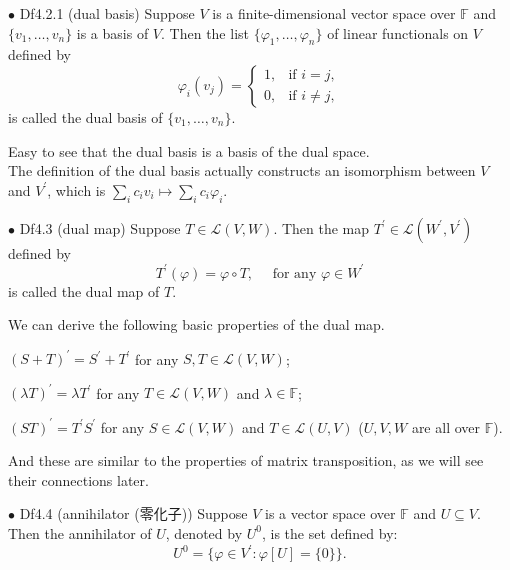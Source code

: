 \documentclass{article}
\begin{document}
\begin{Df}{$\bullet$ Df4.2.1 (dual basis)}
    Suppose $V$ is a finite-dimensional vector space over $\mathbb{F}$ and $\{v_1, \dots, v_n\}$ is a basis of $V$. Then the list $\{\varphi_1, \dots, \varphi_n\}$ of linear functionals on $V$ defined by
    \begin{equation*}
        \varphi_i(v_j) = \begin{cases}
            1, & \text{if } i = j,\\
            0, & \text{if } i \neq j,
        \end{cases}
    \end{equation*}
    is called the dual basis of $\{v_1, \dots, v_n\}$.
\end{Df}

\begin{Rmk}{}
    Easy to see that \textcolor{Th}{the dual basis is a basis of the dual space.}\\
    \textcolor{Th}{The definition of the dual basis actually constructs an isomorphism between $V$ and $V^\prime$, which is $\sum_{i} c_iv_i\mapsto \sum_{i} c_i\varphi_i$.}
\end{Rmk}

\begin{Df}{$\bullet$ Df4.3 (dual map)}
    Suppose $T\in\mathcal{L}(V, W)$. Then the map $T^\prime\in\mathcal{L}(W^\prime, V^\prime)$ defined by
    $$ T^\prime(\varphi) = \varphi\circ T, \quad\text{ for any }\varphi\in W^\prime$$
    is called the dual map of $T$.
\end{Df}

\begin{Rmk}{}
    We can derive the following basic properties of the dual map.
    \begin{compactenum}
        \item $(S+T)^\prime = S^\prime + T^\prime$ for any $S, T\in\mathcal{L}(V, W)$;
        \item $(\lambda T)^\prime = \lambda T^\prime$ for any $T\in\mathcal{L}(V, W)$ and $\lambda\in\mathbb{F}$;
        \item $(ST)^\prime = T^\prime S^\prime$ for any $S\in\mathcal{L}(V, W)$ and $T\in\mathcal{L}(U, V)$ ($U, V, W$ are all over $\mathbb{F}$).
    \end{compactenum}
    And these are similar to the properties of matrix transposition, as we will see their connections later.
\end{Rmk}

\begin{Df}{$\bullet$ Df4.4 (annihilator (零化子))}
    Suppose $V$ is a vector space over $\mathbb{F}$ and $U\subseteq V$. Then the annihilator of $U$, denoted by $U^0$, is the set defined by:
    $$U^0 = \{\varphi\in V^\prime: \varphi[U] = \{0\}\}.$$
\end{Df}
\end{document}
